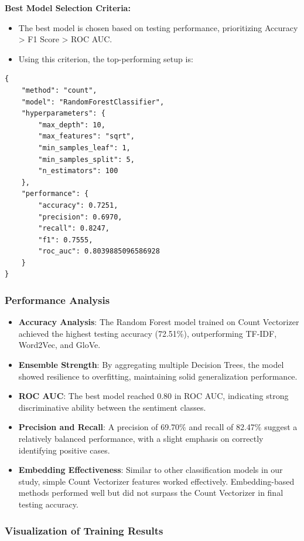 \textbf{Best Model Selection Criteria:}

\begin{itemize}
    \item The best model is chosen based on testing performance, prioritizing Accuracy > F1 Score > ROC AUC.
    \item Using this criterion, the top-performing setup is:
\end{itemize}

\begin{verbatim}
{
    "method": "count",
    "model": "RandomForestClassifier",
    "hyperparameters": {
        "max_depth": 10,
        "max_features": "sqrt",
        "min_samples_leaf": 1,
        "min_samples_split": 5,
        "n_estimators": 100
    },
    "performance": {
        "accuracy": 0.7251,
        "precision": 0.6970,
        "recall": 0.8247,
        "f1": 0.7555,
        "roc_auc": 0.8039885096586928
    }
}
\end{verbatim}

\subsubsection{Performance Analysis}

\begin{itemize}
    \item \textbf{Accuracy Analysis}: The Random Forest model trained on Count Vectorizer achieved the highest testing accuracy (72.51\%), outperforming TF-IDF, Word2Vec, and GloVe.
    \item \textbf{Ensemble Strength}: By aggregating multiple Decision Trees, the model showed resilience to overfitting, maintaining solid generalization performance.
    \item \textbf{ROC AUC}: The best model reached 0.80 in ROC AUC, indicating strong discriminative ability between the sentiment classes.
    \item \textbf{Precision and Recall}: A precision of 69.70\% and recall of 82.47\% suggest a relatively balanced performance, with a slight emphasis on correctly identifying positive cases.
    \item \textbf{Embedding Effectiveness}: Similar to other classification models in our study, simple Count Vectorizer features worked effectively. Embedding-based methods performed well but did not surpass the Count Vectorizer in final testing accuracy.
\end{itemize}

\subsubsection{Visualization of Training Results}

